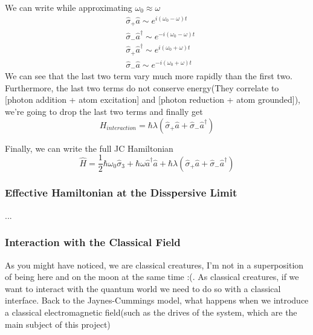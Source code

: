 \documentclass[english, a4paper, 12pt, twoside]{article}
\numberwithin{equation}{section} %
\begin{document}
We can write while approximating $\omega_0 \approx \omega$
\begin{equation}
    \begin{split}
        &\hat{\sigma}_+\hat{a} \sim e^{i(\omega_0 - \omega)t}\\
        &\hat{\sigma}_-\hat{a}^\dag \sim e^{-i(\omega_0 - \omega)t}\\
        &\hat{\sigma}_+\hat{a}^\dag \sim e^{i(\omega_0 + \omega)t}\\
        &\hat{\sigma}_-\hat{a} \sim e^{-i(\omega_0 + \omega)t}
    \end{split}
\end{equation}
We can see that the last two term vary much more rapidly than the first two. Furthermore, the last two terms do not conserve energy(They correlate to [photon addition + atom excitation] and [photon reduction + atom grounded]), we're going to drop the last two terms and finally get
\begin{equation}
    \boxed{H_{interaction} = \hbar\lambda(\hat{\sigma}_+\hat{a} + \hat{\sigma}_-\hat{a}^\dag)}
\end{equation}

\par

Finally, we can write the full JC Hamiltonian
\begin{equation}
    \boxed{\hat{H} = \frac{1}{2}\hbar \omega_0\hat{\sigma}_3 
                     + \hbar \omega \hat{a}^\dag \hat{a} 
                     +  \hbar\lambda(\hat{\sigma}_+\hat{a} + \hat{\sigma}_-\hat{a}^\dag)}
\end{equation}

\subsubsection{Effective Hamiltonian at the Disspersive Limit}
...
\subsubsection{Interaction with the Classical Field}
As you might have noticed, we are classical creatures, I'm not in a superposition of being here and on the moon at the same time :(. As classical creatures, if we want to interact with the quantum world we need to do so with a classical interface. Back to the Jaynes-Cummings model, what happens when we introduce a classical electromagnetic field(such as the drives of the system, which are the main subject of this project)
\end{document}
